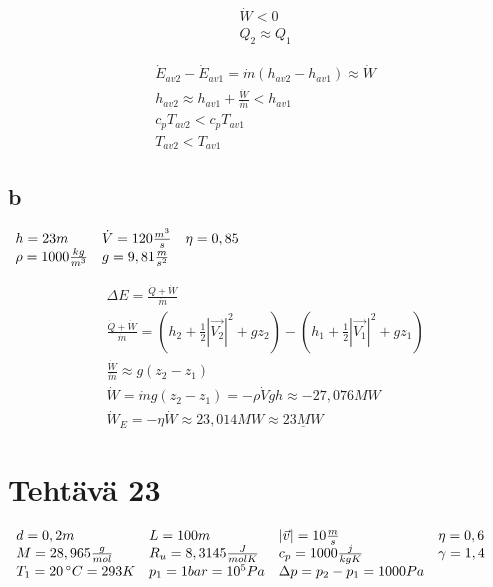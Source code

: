 \documentclass[12pt,a4paper,finnish]{article}
\begin{document}
\begin{align}
 &\dot{W} < 0\\
 &Q_2 \approx Q_1
\end{align}

\begin{align}
 &\dot{E}_{av2} - \dot{E}_{av1} = \dot{m}(h_{av2} - h_{av1}) \approx \dot{W}\\
 &h_{av2} \approx h_{av1} + \frac{\dot{W}}{\dot{m}} < h_{av1}\\
 &c_pT_{av2} < c_pT_{av1}\\
 &T_{av2} < T_{av1}
\end{align}

\subsection{b}

\begin{math}
\begin{array}{l l l}
 h = 23m & \dot{V} = 120 \frac{m^3}{s} & \eta = 0,85\\
 \rho = 1000\frac{kg}{m^3} & g = 9,81\frac{m}{s^2}&
 \end{array}
\end{math}

\begin{align}
 &\Delta E = \frac{\dot{Q} + \dot{W}}{\dot{m}}\\
 &\frac{\dot{Q} + \dot{W}}{\dot{m}} = \left(h_{2} + \frac{1}{2}|\vec{V_{2}}|^2 + gz_{2}\right) - \left(h_{1} + \frac{1}{2}|\vec{V_{1}}|^2 + gz_{1}\right)\\
 &\frac{\dot{W}}{\dot{m}} \approx g(z_2 - z_1)\\
 &\dot{W} = \dot{m}g(z_2 - z_1) = -\rho\dot{V}gh \approx -27,076 MW\\
 &\dot{W}_E = -\eta\dot{W} \approx 23,014 MW \approx \underline{23 MW}
\end{align}

\section{Tehtävä 23}

\begin{math}
 \begin{array}{l l l l}
  d = 0,2m & L =100m & |\vec{v}| = 10 \frac{m}{s} & \eta = 0,6\\
  M = 28,965 \frac{g}{mol} & R_u = 8,3145 \frac{J}{molK} & c_p = 1000 \frac{j}{kgK} & \gamma = 1,4\\
  T_1 = 20\,^{\circ}C = 293K & p_1 = 1 bar = 10^5 Pa & \Delta p = p_2 - p_1 = 1000 Pa &
 \end{array}
\end{math}
\end{document}
